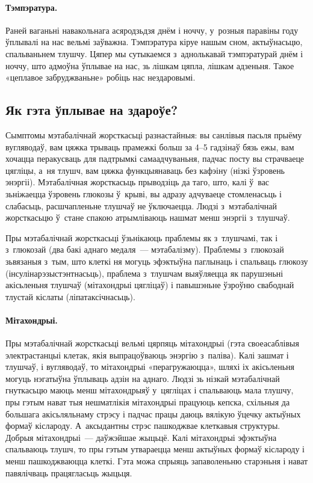 
\paragraph{Тэмпэратура.}
Раней ваганьні навакольнага асяродзьдзя днём і ноччу, у~розныя паравіны году ўплывалі на нас вельмі заўважна. Тэмпэратура кіруе нашым сном, актыўнасьцю, спальваньнем тлушчу. Цяпер мы сутыкаемся з~аднолькавай тэмпэратурай днём і ноччу, што адмоўна ўплывае на нас, зь лішкам цяпла, лішкам адзеньня. Такое «цеплавое забруджваньне» робіць нас нездаровымі.

\subsection{Як гэта ўплывае на здароўе?}

Сымптомы мэтабалічнай жорсткасьці разнастайныя: вы санлівыя пасьля прыёму вугляводаў, вам цяжка трываць прамежкі больш за 4--5 гадзінаў бязь ежы, вам хочацца перакусваць для падтрымкі самаадчуваньня, падчас посту вы страчваеце цягліцы, а~ня тлушч, вам цяжка функцыянаваць без кафэіну (нізкі ўзровень энэргіі). Мэтабалічная жорсткасьць прыводзіць да таго, што, калі ў~вас зьніжаецца ўзровень глюкозы ў~крыві, вы адразу адчуваеце стомленасьць і слабасьць, расшчапленьне тлушчаў не ўключаецца. Людзі з~мэтабалічнай жорсткасьцю ў~стане спакою атрымліваюць нашмат менш энэргіі з~тлушчаў.

Пры мэтабалічнай жорсткасьці ўзьнікаюць праблемы як з~тлушчамі, так і з~глюкозай (два бакі аднаго медаля~--- мэтабалізму). Праблемы з~глюкозай зьвязаныя з~тым, што клеткі ня могуць эфэктыўна паглынаць і спальваць глюкозу (інсулінарэзыстэнтнасьць), праблема з~тлушчам выяўляецца як парушэньні акісьленьня тлушчаў (мітахондрыі цягліцаў) і павышэньне ўзроўню свабоднай тлустай кіслаты (ліпатаксічнасьць).

\paragraph{Мітахондрыі.}
Пры мэтабалічнай жорсткасьці вельмі цярпяць мітахондрыі (гэта своеасаблівыя электрастанцыі клетак, якія выпрацоўваюць энэргію з~паліва). Калі зашмат і тлушчаў, і вугляводаў, то мітахондрыі «перагружаюцца», шляхі іх акісьленьня могуць нэгатыўна ўплываць адзін на аднаго. Людзі зь нізкай мэтабалічнай гнуткасьцю маюць менш мітахондрыяў у~цягліцах і спальваюць мала тлушчу, пры гэтым нават тыя нешматлікія мітахондрыі працуюць кепска, схільныя да большага акісьляльнаму стрэсу і падчас працы даюць вялікую ўцечку актыўных формаў кіслароду. А~аксыдантны стрэс пашкоджвае клеткавыя структуры. Добрыя мітахондрыі~--- даўжэйшае жыцьцё. Калі мітахондрыі эфэктыўна спальваюць тлушч, то пры гэтым утвараецца менш актыўных формаў кіслароду і менш пашкоджваюцца клеткі. Гэта можа спрыяць запаволеньню старэньня і нават павялічваць працягласьць жыцьця.

